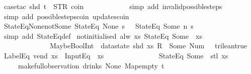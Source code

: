 \begin{isabellebody}
\ {\isacharparenleft}case{\isacharunderscore}tac\ {\isachardoublequoteopen}shd\ t\ {\isacharequal}\ {\isacharparenleft}STR\ {\isacharprime}{\isacharprime}coin{\isacharprime}{\isacharprime}{\isacharcomma}\ {\isacharbrackleft}{\isacharbrackright}{\isacharparenright}{\isachardoublequoteclose}{\isacharparenright}\isanewline
\ \ \ \ \isamarkupfalse%
\isanewline
\ \ \ \ \ \isamarkupfalse%
\ {\isacharparenleft}simp\ add{\isacharcolon}\ invalid{\isacharunderscore}possible{\isacharunderscore}steps{\isacharunderscore}{}{\isacharparenright}\isanewline
\ \ \isamarkupfalse%
\ {\isacharparenleft}simp\ add{\isacharcolon}\ possible{\isacharunderscore}steps{\isacharunderscore}coin\ updates{\isacharunderscore}coin{\isacharparenright}%
\endisatagproof
{\isafoldproof}%
%
\isadelimproof
\isanewline
%
\endisadelimproof
\isanewline
{}\isamarkupfalse%
\ StateEq{\isacharunderscore}None{\isacharunderscore}not{\isacharunderscore}Some{\isacharcolon}\ {\isachardoublequoteopen}StateEq\ None\ s\ {\isasymLongrightarrow}\ {\isasymnot}\ StateEq\ {\isacharparenleft}Some\ n{\isacharparenright}\ s{\isachardoublequoteclose}\isanewline
%
\isadelimproof
\ \ %
\endisadelimproof
%
\isatagproof
{}\isamarkupfalse%
\ {\isacharparenleft}simp\ add{\isacharcolon}\ StateEq{\isacharunderscore}def{\isacharparenright}%
\endisatagproof
{\isafoldproof}%
%
\isadelimproof
\isanewline
%
\endisadelimproof
\isanewline
{}\isamarkupfalse%
\ not{\isacharunderscore}initialised{\isacharcolon}\ {\isachardoublequoteopen}alw\ {\isacharparenleft}{\isasymlambda}xs{\isachardot}\ StateEq\ {\isacharparenleft}Some\ {}{\isacharparenright}\ xs\ {\isasymand}\isanewline
\ \ \ \ \ \ \ \ \ \ \ \ \ \ MaybeBoolInt\ {\isacharparenleft}{\isacharless}{\isacharparenright}\ {\isacharparenleft}datastate\ {\isacharparenleft}shd\ xs{\isacharparenright}\ {\isacharparenleft}R\ {}{\isacharparenright}{\isacharparenright}\ {\isacharparenleft}Some\ {\isacharparenleft}Num\ {}{\isacharparenright}{\isacharparenright}\ {\isacharequal}\ trilean{\isachardot}true\ {\isasymand}\ LabelEq\ {\isacharprime}{\isacharprime}vend{\isacharprime}{\isacharprime}\ xs\ {\isasymand}\ InputEq\ {\isacharbrackleft}{\isacharbrackright}\ xs\ {\isasymlongrightarrow}\isanewline
\ \ \ \ \ \ \ \ \ \ \ \ \ \ StateEq\ {\isacharparenleft}Some\ {}{\isacharparenright}\ {\isacharparenleft}stl\ xs{\isacharparenright}{\isacharparenright}\isanewline
\ \ \ \ \ {\isacharparenleft}make{\isacharunderscore}full{\isacharunderscore}observation\ drinks\ None\ Map{\isachardot}empty\ t{\isacharparenright}{\isachardoublequoteclose}\isanewline

\end{isabellebody}
